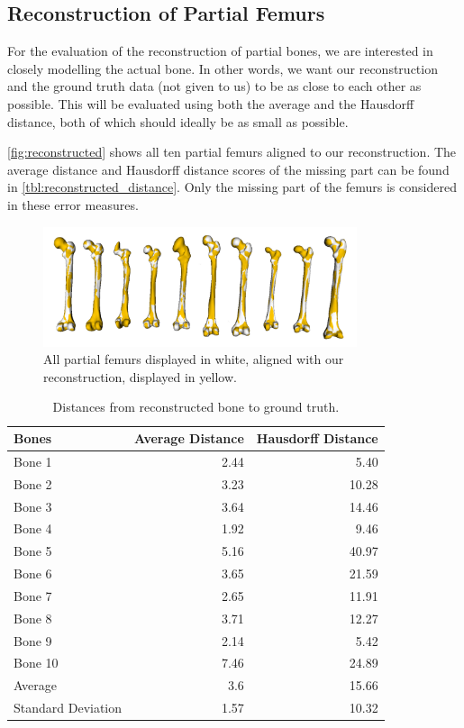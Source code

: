 
\subsection{Reconstruction of Partial Femurs}
\label{subsec:reconresults}
For the evaluation of the reconstruction of partial bones, we are interested in closely modelling the actual bone.
In other words, we want our reconstruction and the ground truth data (not given to us) to be as close to each other as possible. 
This will be evaluated using both the average and the Hausdorff distance, both of which should ideally be as small as possible.

\autoref{fig:reconstructed} shows all ten partial femurs aligned to our reconstruction.
The average distance and Hausdorff distance scores of the missing part can be found in \autoref{tbl:reconstructed_distance}.
Only the missing part of the femurs is considered in these error measures.

\begin{figure}
	\centering
  \includegraphics[width=0.82\textwidth]{./Figures/reconstruction_summary}
  \caption{All partial femurs displayed in white, aligned with our reconstruction, displayed in yellow.}
  \label{fig:reconstructed}
\end{figure}

\begin{table}
  \centering
  \caption{Distances from reconstructed bone to ground truth.}
  \label{tbl:reconstructed_distance}
  \begin{tabular}{lrr}
    \toprule
      \textbf{Bones} &
      Average Distance &
      Hausdorff Distance \\
    \midrule
      Bone 1& 2.44 & 5.40 \\
      Bone 2& 3.23 & 10.28 \\
      Bone 3& 3.64 & 14.46 \\
      Bone 4& 1.92 & 9.46 \\
      Bone 5& 5.16 & 40.97 \\
      Bone 6& 3.65 & 21.59 \\
      Bone 7& 2.65 & 11.91 \\
      Bone 8& 3.71 & 12.27 \\
      Bone 9& 2.14 & 5.42 \\
      Bone 10& 7.46 & 24.89 \\
    \midrule
      Average& 3.6 & 15.66 \\
      Standard Deviation& 1.57 & 10.32 \\
    \bottomrule
  \end{tabular}
\end{table}